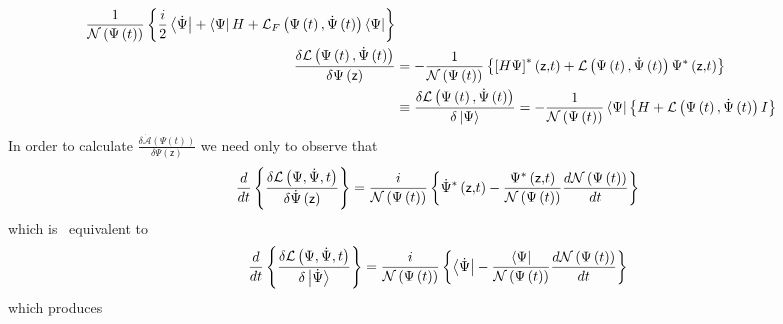 \documentclass[aps,preprint]{revtex4}
\begin{document}
\begin{align}
\frac{1}{\mathcal{N}\left( \Psi\left( t\right) \right) }\left\{ \frac{i}{2}%
\left\langle \dot{\Psi}\right| +\left\langle \Psi\right| H+\mathcal{L}%
_{F}\left( \Psi\left( t\right) ,\dot{\Psi}\left( t\right) \right)
\left\langle \Psi\right| \right\} \\
\frac{\delta\mathcal{L}\left( \Psi\left( t\right) ,\dot{\Psi}\left( t\right)
\right) }{\delta\Psi\left( \mathsf{z}\right) } & =-\frac {1}{\mathcal{N}%
\left( \Psi\left( t\right) \right) }\left\{ \left[ H\Psi\right]
^{\ast}\left( \mathsf{z,}t\right) +\mathcal{L}\left( \Psi\left( t\right) ,%
\dot{\Psi}\left( t\right) \right) \Psi^{\ast}\left( \mathsf{z,}t\right)
\right\}  \notag \\
& \equiv\frac{\delta\mathcal{L}\left( \Psi\left( t\right) ,\dot{\Psi }\left(
t\right) \right) }{\delta\left| \Psi\right\rangle }=-\frac {1}{\mathcal{N}%
\left( \Psi\left( t\right) \right) }\left\langle \Psi\right| \left\{ H+%
\mathcal{L}\left( \Psi\left( t\right) ,\dot{\Psi }\left( t\right) \right)
I\right\}
\end{align}
In order to calculate $\frac{\delta\mathcal{\dot{A}}\left( \Psi\left(
t\right) \right) }{\delta\Psi\left( \mathsf{z}\right) }$ we need only to
observe that 
\begin{equation}
\frac{d}{dt}\left\{ \frac{\delta\mathcal{L}\left( \Psi,\dot{\Psi},t\right) }{%
\delta\dot{\Psi}\left( \mathsf{z}\right) }\right\} =\frac{i}{\mathcal{N}%
\left( \Psi\left( t\right) \right) }\left\{ \dot{\Psi}^{\ast }\left( \mathsf{%
z,}t\right) -\frac{\Psi^{\ast}\left( \mathsf{z,}t\right) }{\mathcal{N}\left(
\Psi\left( t\right) \right) }\frac{d\mathcal{N}\left( \Psi\left( t\right)
\right) }{dt}\right\}
\end{equation}
which is \ equivalent to 
\begin{equation}
\frac{d}{dt}\left\{ \frac{\delta\mathcal{L}\left( \Psi,\dot{\Psi},t\right) }{%
\delta\left| \dot{\Psi}\right\rangle }\right\} =\frac{i}{\mathcal{N}\left(
\Psi\left( t\right) \right) }\left\{ \left\langle \dot{\Psi }\right| -\frac{%
\left\langle \Psi\right| }{\mathcal{N}\left( \Psi\left( t\right) \right) }%
\frac{d\mathcal{N}\left( \Psi\left( t\right) \right) }{dt}\right\}
\end{equation}
which produces 
\end{document}

